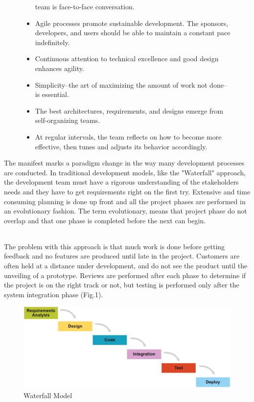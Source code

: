 \begin{figure}[h]
\begin{minipage}[t]{0.3\textwidth}
\begin{itemize}
                team is face-to-face conversation.
            \item Agile processes promote sustainable development. 
                    The sponsors, developers, and users should be able 
                 to maintain a constant pace indefinitely.
            \item Continuous attention to technical excellence 
                    and good design enhances agility.
            \item Simplicity--the art of maximizing the amount 
                    of work not done--is essential.
            \item The best architectures, requirements, and designs 
                    emerge from self-organizing teams.
            \item At regular intervals, the team reflects on how 
               to become more effective, then tunes and adjusts 
               its behavior accordingly.
        \end{itemize}
    \end{minipage}
\end{figure}


\newpage
\noindent
The manifest marks a paradigm change in the way many development processes are conducted. 
In traditional development models, like the "Waterfall" approach, the development team must have a rigorous understanding of the stakeholders needs and they have to get requirements right on the first try. Extensive and time consuming planning is done up front and all the project phases are performed in an evolutionary fashion. The term evolutionary, means that project phase do not overlap and that one phase is completed before the next can begin.  

\\
The problem with this approach is that much work is done before getting feedback and no features are produced until late in the project. Customers are often held at a distance under development, and do not see the product until the unveiling of a prototype. Reviews are performed after each phase to determine if the project is on the right track or not, but testing is performed only after the system integration phase (Fig.1). 
\begin{figure} [H]
 \includegraphics{VAPIQ-PICTURES/WaterFall.PNG}
 \caption{Waterfall Model}
\end{figure} 

